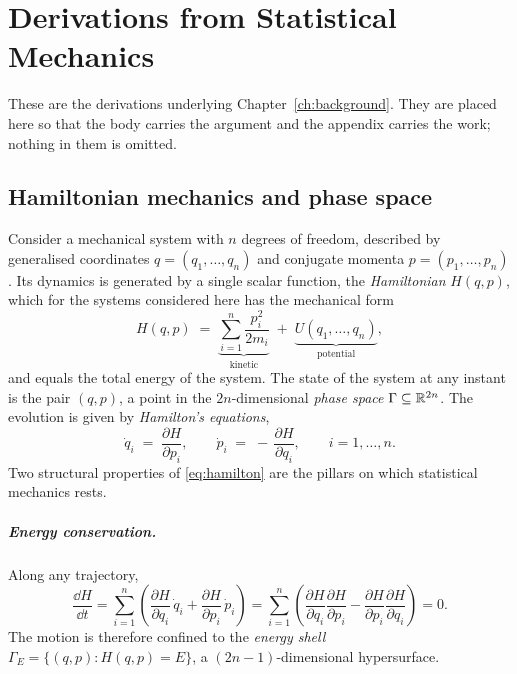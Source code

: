 \chapter{Derivations from Statistical Mechanics}
\label{app:statmech}

These are the derivations underlying Chapter~\ref{ch:background}. They are
placed here so that the body carries the argument and the appendix carries
the work; nothing in them is omitted.

\section{Hamiltonian mechanics and phase space}\label{sec:hamiltonian}

Consider a mechanical system with $n$ degrees of freedom, described by
generalised coordinates $q = (q_1, \dots, q_n)$ and conjugate momenta
$p = (p_1, \dots, p_n)$. Its dynamics is generated by a single scalar
function, the \emph{Hamiltonian} $H(q, p)$, which for the systems
considered here has the mechanical form
\begin{equation}
  H(q, p) \;=\; \underbrace{\sum_{i=1}^{n} \frac{p_i^2}{2m_i}}_{\text{kinetic}}
  \;+\; \underbrace{U(q_1, \dots, q_n)}_{\text{potential}},
  \label{eq:hamiltonian}
\end{equation}
and equals the total energy of the system. The state of the system at any
instant is the pair $(q, p)$, a point in the $2n$-dimensional \emph{phase
space} $\Gamma \subseteq \mathbb{R}^{2n}$. The evolution is given by
\emph{Hamilton's equations},
\begin{equation}
  \dot{q}_i \;=\; \frac{\partial H}{\partial p_i},
  \qquad
  \dot{p}_i \;=\; -\,\frac{\partial H}{\partial q_i},
  \qquad i = 1, \dots, n.
  \label{eq:hamilton}
\end{equation}
Two structural properties of \eqref{eq:hamilton} are the pillars on which
statistical mechanics rests.

\paragraph{Energy conservation.} Along any trajectory,
\begin{equation}
  \frac{\dd H}{\dd t}
  = \sum_{i=1}^n \left(
      \frac{\partial H}{\partial q_i}\,\dot q_i
      + \frac{\partial H}{\partial p_i}\,\dot p_i
    \right)
  = \sum_{i=1}^n \left(
      \frac{\partial H}{\partial q_i}\frac{\partial H}{\partial p_i}
      - \frac{\partial H}{\partial p_i}\frac{\partial H}{\partial q_i}
    \right)
  = 0 .
  \label{eq:energy-conservation}
\end{equation}
The motion is therefore confined to the \emph{energy shell}
$\Gamma_E = \{(q,p) : H(q,p) = E\}$, a $(2n-1)$-dimensional hypersurface.

